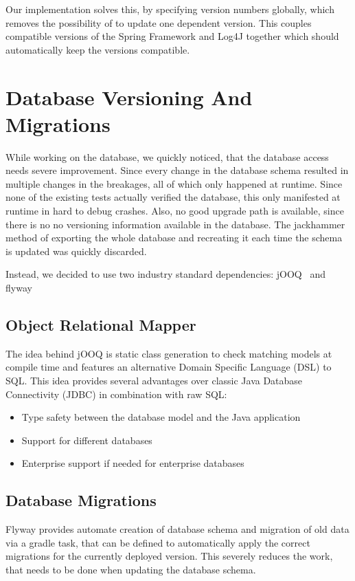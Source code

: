 Our implementation solves this, by specifying version numbers globally, which removes the possibility of 
to update one dependent version.
This couples compatible versions of the Spring Framework and Log4J together which should automatically keep the versions
compatible.

\section{Database Versioning And Migrations}\label{sec:databaseVersioningAndMigrations}
While working on the database, we quickly noticed, that the database access needs severe improvement.
Since every change in the database schema resulted in multiple changes in the breakages, all of which only happened at
runtime.
Since none of the existing tests actually verified the database, this only manifested at runtime in hard to debug
crashes.
Also, no good upgrade path is available, since there is no no versioning information available in the database.
The jackhammer method of exporting the whole database and recreating it each time the schema is updated was quickly
discarded.

Instead, we decided to use two industry standard dependencies: jOOQ~\cite{jooq} and flyway~\cite{flyway}

\subsection*{Object Relational Mapper}
The idea behind jOOQ is static class generation to check matching models at compile time and features an alternative
Domain Specific Language (DSL) to SQL\@.
This idea provides several advantages over classic Java Database Connectivity (JDBC) in combination with raw SQL:
\begin{itemize}
\item Type safety between the database model and the Java application
\item Support for different databases
\item Enterprise support if needed for enterprise databases
\end{itemize}


\subsection*{Database Migrations}
Flyway provides automate creation of database schema and migration of old data via a gradle task, that can be defined to
automatically apply the correct migrations for the currently deployed version.
This severely reduces the work, that needs to be done when updating the database schema.

